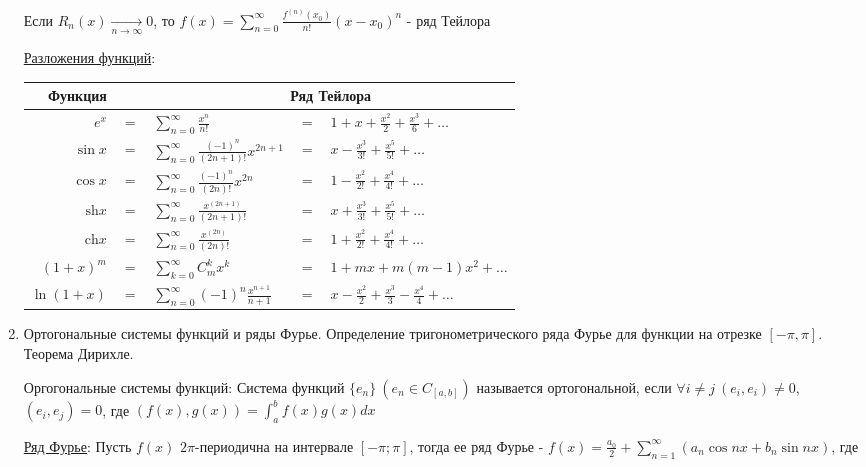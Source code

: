 \begin{enumerate}
    \Ths Если $R_n(x) \underset{n \to \infty}{\longrightarrow} 0$, то $f(x) = \sum_{n = 0}^\infty \frac{f^{(n)}(x_0)}{n!} (x - x_0)^n$ - ряд Тейлора

    \hyperlink{taylorsseriesoffunctions}{Разложения функций}:

    \begin{tabular}{rclcl}
        Функция & & \multicolumn{3}{c}{Ряд Тейлора} \\
        \hline
        $e^x$ & $=$ & $\sum_{n = 0}^\infty \frac{x^n}{n!}$ & $=$ & $1 + x + \frac{x^2}{2} + \frac{x^3}{6} + \dots$ \\
        \hline
        $\sin x$ & $=$ & $\sum_{n = 0}^\infty \frac{(-1)^n}{(2n + 1)!}x^{2n + 1}$ & $=$ & $x - \frac{x^3}{3!} + \frac{x^5}{5!} + \dots$ \\
        \hline
        $\cos x$ & $=$ & $\sum_{n = 0}^\infty \frac{(-1)^n}{(2n)!}x^{2n}$ & $=$ & $1 - \frac{x^2}{2!} + \frac{x^4}{4!} + \dots$ \\
        \hline
        $\mathrm{sh} x$ & $=$ & $\sum_{n = 0}^\infty \frac{x^{(2n + 1)}}{(2n + 1)!}$ & $=$ & $x + \frac{x^3}{3!} + \frac{x^5}{5!} + \dots$\\
        \hline
        $\mathrm{ch} x$ & $=$ & $\sum_{n = 0}^\infty \frac{x^{(2n)}}{(2n)!}$  & $=$ & $1 + \frac{x^2}{2!} + \frac{x^4}{4!} + \dots$\\
        \hline 
        $(1 + x)^m$ & $=$ & $\sum_{k = 0}^\infty C_m^k x^k$ & $=$ & $1 + mx + m(m - 1)x^2 + \dots$\\
        \hline
        $\ln(1 + x)$ & $=$ & $\sum_{n = 0}^\infty (-1)^n \frac{x^{n + 1}}{n + 1}$ & $=$ & $x - \frac{x^2}{2} + \frac{x^3}{3} - \frac{x^4}{4} + \dots$ \\
    \end{tabular}

    \item Ортогональные системы функций и ряды Фурье. Определение тригонометрического ряда
    Фурье для функции на отрезке $[-\pi, \pi]$. Теорема Дирихле.

    Оргогональные системы функций: 
    Система функций $\{e_n\} \ (e_n \in C_{[a, b]})$ называется ортогональной, 
    если $\forall i \neq j \ (e_i, e_i) \neq 0$, $(e_i, e_j) = 0$, где
    $(f(x), g(x)) = \int_{a}^{b} f(x) g(x) dx$

    \hyperlink{fouriersseries}{Ряд Фурье}: Пусть $f(x)$ $2\pi$-периодична на интервале $[-\pi;\pi]$, тогда ее ряд Фурье - $f(x) = \frac{a_0}{2} + \sum_{n = 1}^\infty (a_n \cos nx + b_n \sin nx)$, где 
    

\end{enumerate}
